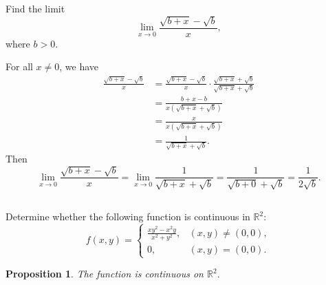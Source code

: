 \documentclass[12pt]{article}
\newenvironment{problem}
    {\begin{lrbox}{\mybox}\begin{minipage}{0.98\textwidth}}
    {\end{minipage}\end{lrbox}\framebox[\textwidth]{\usebox{\mybox}}}
\newtheorem{proposition}{Proposition}
\newcommand{\R}{\mathbb{R}}
\begin{document}
\newpage
\section{}
\subsection{}
\begin{problem}
    Find the  limit 
    \begin{equation}
        \lim_{x\to 0} \frac{\sqrt{b + x} - \sqrt{b}}{x},
    \end{equation}
    where $b>0$.
\end{problem}
\medskip

For all $x \ne 0$, we have
\begin{align*}
    \frac{\sqrt{b+x} - \sqrt{b}}{x}
        &= \frac{\sqrt{b+x} - \sqrt{b}}{x} \cdot \frac{\sqrt{b + x} + \sqrt{b}}{\sqrt{b + x} + \sqrt{b}} \\[1em]
        &= \frac{b + x - b}{x \left( \sqrt{b + x} + \sqrt{b} \right)} \\[1em]
        &= \frac{x}{x \left( \sqrt{b + x} + \sqrt{b} \right)} \\[1em]
        &= \frac{1}{\sqrt{b + x} + \sqrt{b}}.
\end{align*}
Then
\[
    \lim_{x\to 0} \frac{\sqrt{b + x} - \sqrt{b}}{x}
        = \lim_{x\to 0} \frac{1}{\sqrt{b + x} + \sqrt{b}} 
        = \frac{1}{\sqrt{b + 0} + \sqrt{b}}
        = \frac{1}{2\sqrt{b}}.
\]

\newpage
\subsection{}
\begin{problem}
    Determine whether the following function is continuous in $\R^2$:
    \begin{equation}
        f(x,y) = \left \{ \begin{array}{lr}
            \frac{xy^2-x^2y}{x^2+y^2},& (x,y) \ne (0,0),\\
            0,& (x,y) = (0,0).
        \end{array}\right .
    \end{equation}
\end{problem}

\begin{proposition}
    The function is continuous on $\R^2$.
\end{proposition}
\end{document}
